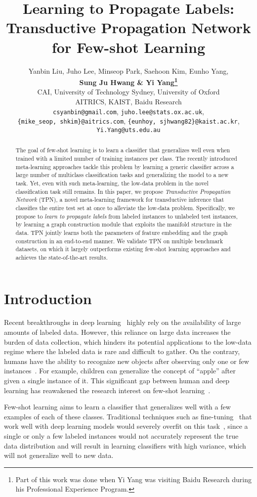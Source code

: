 \documentclass{article} \usepackage{iclr2019_conference,times}
\title{Learning to Propagate Labels: Transductive Propagation Network for Few-shot Learning}
\author{
    Yanbin Liu, Juho Lee, Minseop Park, Saehoon Kim, Eunho Yang, \\
    \textbf{Sung Ju Hwang \& Yi Yang\thanks{Part of this work was done when Yi Yang was visiting Baidu Research during his Professional Experience Program.}}\\
    CAI, University of Technology Sydney, University of Oxford\\ 
    AITRICS, KAIST, Baidu Research\\
    \texttt{csyanbin@gmail.com}, \texttt{juho.lee@stats.ox.ac.uk}, \\
    \texttt{\{mike\_seop, shkim\}@aitrics.com}, \texttt{\{eunhoy, sjhwang82\}@kaist.ac.kr},\\ \texttt{Yi.Yang@uts.edu.au}
}
\begin{document}
\maketitle

\begin{abstract}
The goal of few-shot learning is to learn a classifier that generalizes well even when trained with a limited number of training instances per class. The recently introduced meta-learning approaches tackle this problem by learning a generic classifier across a large number of multiclass classification tasks and generalizing the model to a new task. Yet, even with such meta-learning, the low-data problem in the novel classification task still remains. In this paper, we propose \textit{Transductive Propagation Network} (TPN), a novel meta-learning framework for transductive inference that classifies the entire test set at once to alleviate the low-data problem. Specifically, we propose to \emph{learn to propagate labels} from labeled instances to unlabeled test instances, by learning a graph construction module that exploits the manifold structure in the data. TPN jointly learns both the parameters of feature embedding and the graph construction in an end-to-end manner.  We validate TPN on multiple benchmark datasets, on which it largely outperforms existing few-shot learning approaches and achieves the state-of-the-art results. 



\end{abstract}

\section{Introduction}
Recent breakthroughs in deep learning~\citep{imagenet,vgg,resnet} highly rely on the availability of large amounts of labeled data. However, this reliance on large data increases the burden of data collection, which hinders its potential applications to the low-data regime where the labeled data is rare and difficult to gather.
On the contrary, humans have the ability to recognize new objects after observing only one or few instances~\citep{oneshot}. For example, children can generalize the concept of ``apple'' after given a single instance of it. This significant gap between human and deep learning has reawakened the research interest on few-shot learning~\citep{matching,prototypical,maml,metaLSTM,layerwise,memory-few,imaginary}. 

Few-shot learning aims to learn a classifier that generalizes well with a few examples of each of these classes. Traditional techniques such as fine-tuning~\citep{caffe} that work well with deep learning models would severely overfit on this task~\citep{matching,maml}, since a single or only a few labeled instances would not accurately represent the true data distribution and will result in learning classifiers with high variance, which will not generalize well to new data.
\end{document}
